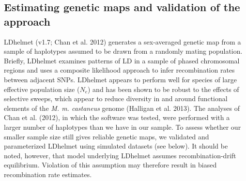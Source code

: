 \subsection{Estimating genetic maps and validation of the approach}
 
	LDhelmet (v1.7; Chan et al. 2012) generates a sex-averaged genetic map from a sample of haplotypes assumed to be drawn from a randomly mating population. Briefly, LDhelmet examines patterns of LD in a sample of phased chromosomal regions and uses a composite likelihood approach to infer recombination rates between adjacent SNPs. LDhelmet appears to perform well for species of large effective population size ($N_e$) and has been shown to be robust to the effects of selective sweeps, which appear to reduce diversity in and around functional elements of the \textit{M. m. castaneus} genome (Halligan et al. 2013). The analyses of Chan et al. (2012), in which the software was tested, were performed with a larger number of haplotypes than we have in our sample. To assess whether our smaller sample size still gives reliable genetic maps, we validated and parameterized LDhelmet using simulated datasets (see below). It should be noted, however, that model underlying LDhelmet assumes recombination-drift equilibrium. Violation of this assumption may therefore result in biased recombination rate estimates. 
 
